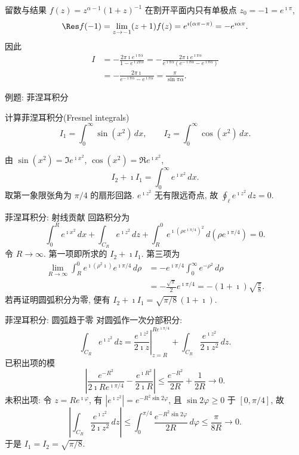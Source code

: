 \documentclass[fontset=windows, chinese, 10pt]{beamer}
\begin{document}
\begin{frame}{留数与结果}
\small
$f(z)=z^{\alpha-1}(1+z)^{-1}$ 在割开平面内只有单极点 $z_0=-1=e^{\imath\pi}$,
\[
\Res f(-1)=\lim_{z\to -1}(z+1)f(z)=e^{\imath(\alpha\pi-\pi)}=-e^{\imath\alpha\pi}.
\]
因此
\[
\begin{aligned}
I
&=-\frac{2\pi\imath e^{\imath\pi\alpha}}{1-e^{\imath 2\pi\alpha}}
=-\frac{2\pi\imath e^{\imath\pi\alpha}}{e^{\imath\pi\alpha}(e^{-\imath\pi\alpha}-e^{\imath\pi\alpha})}\\
&=-\frac{2\pi\imath}{e^{-\imath\pi\alpha}-e^{\imath\pi\alpha}}
=\frac{\pi}{\sin\pi\alpha}.
\end{aligned}
\]
\end{frame}

\begin{frame}{例题: 菲涅耳积分}
\small
\begin{example}
计算菲涅耳积分(Fresnel integrals)
\[
I_1=\int_0^{\infty}\sin(x^2)\,dx,\qquad
I_2=\int_0^{\infty}\cos(x^2)\,dx.
\]
\end{example}
由 $\sin(x^2)=\Im e^{\imath x^2}$, $\cos(x^2)=\Re e^{\imath x^2}$,
\[
I_2+\imath I_1=\int_0^{\infty} e^{\imath x^2}\,dx.
\]
取第一象限张角为 $\pi/4$ 的扇形回路. $e^{\imath z^2}$ 无有限远奇点, 故 $\oint_\ell e^{\imath z^2}\,dz=0$.
\begin{center}
\scalebox{0.62}{}
\end{center}
\end{frame}

\begin{frame}{菲涅耳积分: 射线贡献}
\small
回路积分为
\[
\int_0^R e^{\imath x^2}\,dx
+\int_{C_R} e^{\imath z^2}\,dz
+\int_R^0 e^{\imath(\rho e^{\imath\pi/4})^2}\,d(\rho e^{\imath\pi/4})=0.
\]
令 $R\to\infty$. 第一项即所求的 $I_2+\imath I_1$. 第三项为
\[
\begin{aligned}
\lim_{R\to\infty}\int_R^0 e^{\imath(\rho^2\imath)}e^{\imath\pi/4}\,d\rho
&=-e^{\imath\pi/4}\int_0^{\infty}e^{-\rho^2}\,d\rho\\
&=-\frac{\sqrt{\pi}}{2}e^{\imath\pi/4}=-(1+\imath)\sqrt{\frac{\pi}{8}}.
\end{aligned}
\]
若再证明圆弧积分为零, 便有 $I_2+\imath I_1=\sqrt{\pi/8}\,(1+\imath)$.
\end{frame}

\begin{frame}{菲涅耳积分: 圆弧趋于零}
\small
对圆弧作一次分部积分:
\[
\int_{C_R}e^{\imath z^2}\,dz
=\left.\frac{e^{\imath z^2}}{2\imath z}\right|_{z=R}^{Re^{\imath\pi/4}}
+\int_{C_R}\frac{e^{\imath z^2}}{2\imath z^2}\,dz.
\]
已积出项的模
\[
\left|\frac{e^{-R^2}}{2\imath R e^{\imath\pi/4}}-\frac{e^{\imath R^2}}{2\imath R}\right|
\leqslant\frac{e^{-R^2}}{2R}+\frac{1}{2R}\to 0.
\]
未积出项: 令 $z=Re^{\imath\varphi}$, 有 $|e^{\imath z^2}|=e^{-R^2\sin 2\varphi}$, 且 $\sin 2\varphi\ge 0$ 于 $[0,\pi/4]$, 故
\[
\left|\int_{C_R}\frac{e^{\imath z^2}}{2\imath z^2}\,dz\right|
\leqslant\int_0^{\pi/4}\frac{e^{-R^2\sin 2\varphi}}{2R}\,d\varphi
\leqslant\frac{\pi}{8R}\to 0.
\]
于是 $I_1=I_2=\sqrt{\pi/8}$.
\end{frame}
\end{document}
